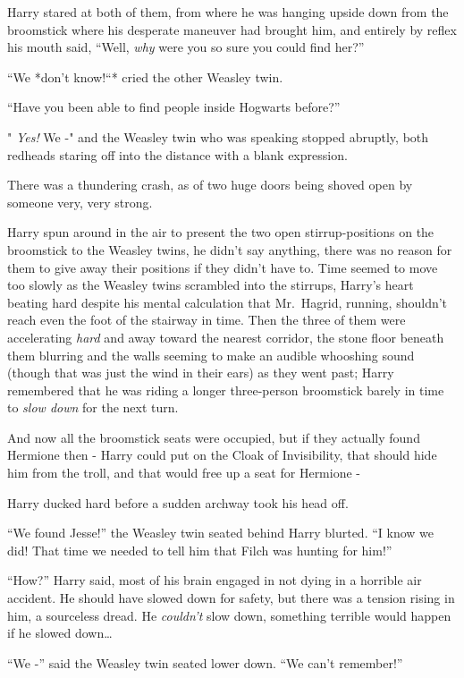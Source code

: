Harry stared at both of them, from where he was hanging upside down from
the broomstick where his desperate maneuver had brought him, and
entirely by reflex his mouth said, ``Well, \emph{why} were you so sure
you could find her?''

``We *don't know!``* cried the other Weasley twin.

``Have you been able to find people inside Hogwarts before?''

" \emph{Yes!} We -" and the Weasley twin who was speaking stopped
abruptly, both redheads staring off into the distance with a blank
expression.

There was a thundering crash, as of two huge doors being shoved open by
someone very, very strong.

Harry spun around in the air to present the two open stirrup-positions
on the broomstick to the Weasley twins, he didn't say anything, there
was no reason for them to give away their positions if they didn't have
to. Time seemed to move too slowly as the Weasley twins scrambled into
the stirrups, Harry's heart beating hard despite his mental calculation
that Mr.~Hagrid, running, shouldn't reach even the foot of the stairway
in time. Then the three of them were accelerating \emph{hard} and away
toward the nearest corridor, the stone floor beneath them blurring and
the walls seeming to make an audible whooshing sound (though that was
just the wind in their ears) as they went past; Harry remembered that he
was riding a longer three-person broomstick barely in time to \emph{slow
down} for the next turn.

And now all the broomstick seats were occupied, but if they actually
found Hermione then - Harry could put on the Cloak of Invisibility, that
should hide him from the troll, and that would free up a seat for
Hermione -

Harry ducked hard before a sudden archway took his head off.

``We found Jesse!'' the Weasley twin seated behind Harry blurted. ``I
know we did! That time we needed to tell him that Filch was hunting for
him!''

``How?'' Harry said, most of his brain engaged in not dying in a
horrible air accident. He should have slowed down for safety, but there
was a tension rising in him, a sourceless dread. He \emph{couldn't} slow
down, something terrible would happen if he slowed down\ldots{}

``We -'' said the Weasley twin seated lower down. ``We can't remember!''

